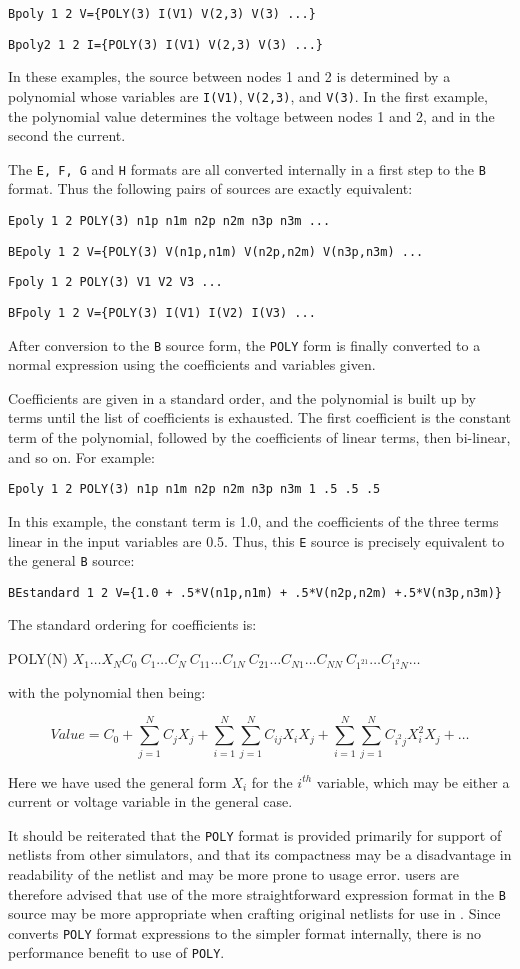 \verb|Bpoly 1 2 V={POLY(3) I(V1) V(2,3) V(3) ...}|

\verb|Bpoly2 1 2 I={POLY(3) I(V1) V(2,3) V(3) ...}|


In these examples, the source between nodes 1 and 2 is determined by a
polynomial whose variables are \texttt{I(V1)}, \texttt{V(2,3)}, and
\texttt{V(3)}.  In the first example, the polynomial value determines
the voltage between nodes 1 and 2, and in the second the current.

The \texttt{E, F, G} and \texttt{H} formats are all converted internally
in a first step to the \texttt{B} format.  Thus the following pairs of
sources are exactly equivalent:

\verb|Epoly 1 2 POLY(3) n1p n1m n2p n2m n3p n3m ...|

\verb|BEpoly 1 2 V={POLY(3) V(n1p,n1m) V(n2p,n2m) V(n3p,n3m) ...|

\verb|Fpoly 1 2 POLY(3) V1 V2 V3 ...|

\verb|BFpoly 1 2 V={POLY(3) I(V1) I(V2) I(V3) ...|

After conversion to the \texttt{B} source form, the \texttt{POLY} form
is finally converted to a normal expression using the coefficients and
variables given.

Coefficients are given in a standard order, and the polynomial is
built up by terms until the list of coefficients is exhausted.  The
first coefficient is the constant term of the polynomial, followed by
the coefficients of linear terms, then bi-linear, and so on.  For example:

\verb|Epoly 1 2 POLY(3) n1p n1m n2p n2m n3p n3m 1 .5 .5 .5|

In this example, the constant term is 1.0, and the coefficients of the
three terms linear in the input variables are 0.5.  Thus, this
\texttt{E} source is precisely equivalent to the general \texttt{B}
source:

\verb|BEstandard 1 2 V={1.0 + .5*V(n1p,n1m) + .5*V(n2p,n2m) +.5*V(n3p,n3m)}|

The standard ordering for coefficients is:

POLY(N) $X_1 \ldots X_N C_0\ C_1 \ldots C_N\ C_{11} \ldots C_{1N}\ C_{21} \ldots C_{N1} \ldots C_{NN}\ C_{1^21} \ldots  C_{1^2N} \ldots$

with the polynomial then being:

$$Value = C_0 + \sum_{j=1}^{N} C_j X_j + \sum_{i=1}^N\sum_{j=1}^N C_{ij}X_iX_j + \sum_{i=1}^N\sum_{j=1}^N C_{i^2j} X_i^2X_j + \ldots$$

Here we have used the general form $X_i$ for the $i^{th}$ variable,
which may be either a current or voltage variable in the general case.

It should be reiterated that the \texttt{POLY} format is provided primarily for
support of netlists from other simulators, and that its compactness may be a
disadvantage in readability of the netlist and may be more prone to usage
error.  \Xyce{} users are therefore advised that use of the more
straightforward expression format in the \texttt{B} source may be more
appropriate when crafting original netlists for use in \Xyce{}.  Since \Xyce{}
converts \texttt{POLY} format expressions to the simpler format internally,
there is no performance benefit to use of \texttt{POLY}.
